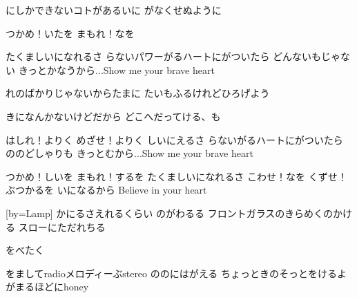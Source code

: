 \documentclass{article}
\newenvironment{Japanese}{%
\CJKfamily{min}%
\CJKtilde
\CJKnospace}{}
\begin{document}
\begin{CJK}{UTF8}{}
\begin{Japanese}
\begin{songs}{}
にしかできないコトがあるいに
がなくせぬように

つかめ！いたを
まもれ！なを

たくましいになれるさ
らないパワーがるハートにがついたら
どんないもじゃない
きっとかなうから...Show me your brave heart

れのばかりじゃないからたまに
たいもふるけれどひろげよう

きになんかないけどだから
どこへだってける、も

はしれ！よりく
めざせ！よりく
しいにえるさ
らないがるハートにがついたら
ののどしゃりも
きっとむから...Show me your brave heart

つかめ！しいを
まもれ！するを
たくましいになれるさ
こわせ！なを
くずせ！ぶつかるを
いになるから
Believe in your heart

\endverse
\endsong

[by=Lamp]
\beginverse
{}かにるさえれるくらい
のがわるる
フロントガラスのきらめくのかける
スローにただれちる

をべたく

をましてradioメロディーぶstereo
ののにはがえる
ちょっときのそっとをけるよ
がまるほどにhoney


\end{songs}
\end{Japanese}
\end{CJK}
\end{document}
